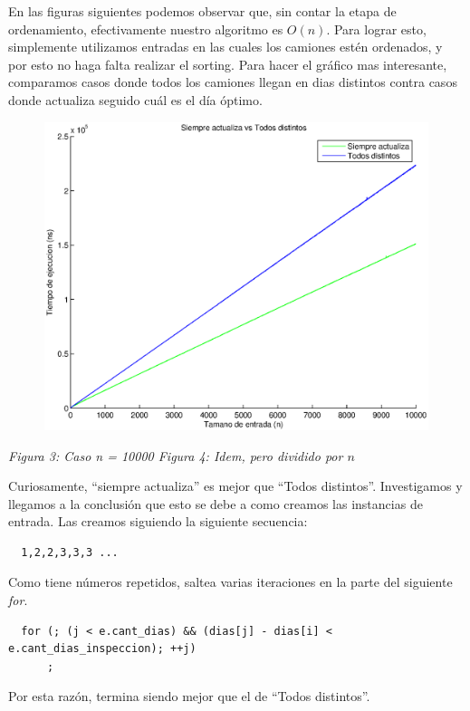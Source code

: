 En las figuras siguientes podemos observar que, sin contar la etapa de ordenamiento, efectivamente nuestro algoritmo es $O(n)$. Para lograr esto, simplemente utilizamos entradas en las cuales los camiones estén ordenados, y por esto no haga falta realizar el sorting. Para hacer el gráfico mas interesante, comparamos casos donde todos los camiones llegan en dias distintos contra casos donde actualiza seguido cuál es el día óptimo.

  \begin{figure}[H]
    \includegraphics[width=0.5\linewidth]{problema1/graficos/problema1_ordenada_siempre_actualiza_10000_vs_problema1_ordenada_todos_distintos_10000.eps}
\end{figure}
\emph{\hspace{2,5cm}Figura 3: Caso n = 10000 \hspace{3cm}Figura 4: Idem, pero dividido por $n$}

Curiosamente, ``siempre actualiza'' es mejor que ``Todos distintos''. Investigamos y llegamos a la conclusión que esto se debe a como creamos las instancias de entrada. Las creamos siguiendo la siguiente secuencia:

\begin{verbatim}
  1,2,2,3,3,3 ...
\end{verbatim}

Como tiene números repetidos, saltea varias iteraciones en la parte del siguiente \emph{for}.

\begin{verbatim}
  for (; (j < e.cant_dias) && (dias[j] - dias[i] < e.cant_dias_inspeccion); ++j)
      ;
\end{verbatim}

Por esta razón, termina siendo mejor que el de ``Todos distintos''.
